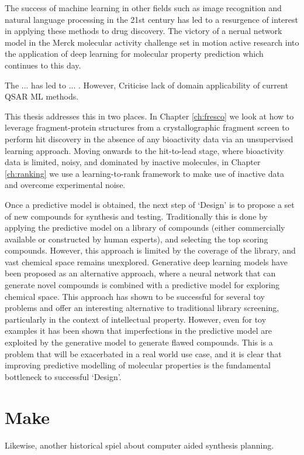 The success of machine learning in other fields such as image recognition and natural language processing in the 21st century has led to a resurgence of interest in applying these methods to drug discovery. The victory of a nerual network model in the Merck molecular activity challenge set in motion active research into the application of deep learning for molecular property prediction which continues to this day.

The ... has led to ... . However, Criticise lack of domain applicability of current QSAR ML methods. 

This thesis addresses this in two places. In Chapter \ref{ch:fresco} we look at how to leverage fragment-protein structures from a crystallographic fragment screen to perform hit discovery in the absence of any bioactivity data via an unsupervised learning approach. Moving onwards to the hit-to-lead stage, where bioactivity data is limited, noisy, and dominated by inactive molecules, in Chapter \ref{ch:ranking} we use a learning-to-rank framework to make use of inactive data and overcome experimental noise.

Once a predictive model is obtained, the next step of `Design' is to propose a set of new compounds for synthesis and testing. Traditionally this is done by applying the predictive model on a library of compounds (either commercially available or constructed by human experts), and selecting the top scoring compounds. However, this approach is limited by the coverage of the library, and vast chemical space remains unexplored. Generative deep learning models have been proposed as an alternative approach, where a neural network that can generate novel compounds is combined with a predictive model for exploring chemical space. This approach has shown to be successful for several toy problems and offer an interesting alternative to traditional library screening, particularly in the context of intellectual property. However, even for toy examples it has been shown that imperfections in the predictive model are exploited by the generative model to generate flawed compounds. This is a problem that will be exacerbated in a real world use case, and it is clear that improving predictive modelling of molecular properties is the fundamental bottleneck to successful `Design'.

\section*{Make}
Likewise, another historical spiel about computer aided synthesis planning.

